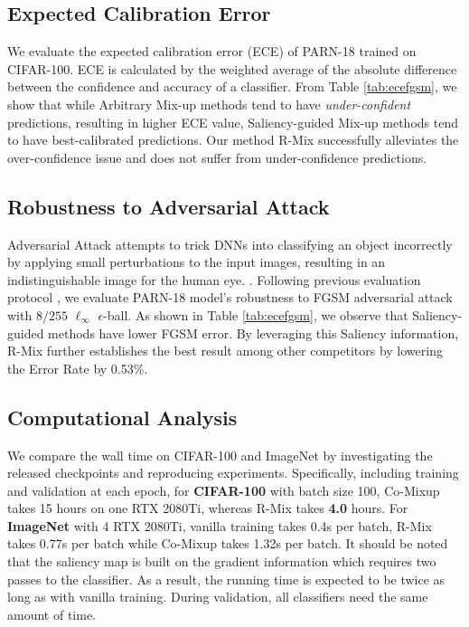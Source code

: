 \documentclass[letterpaper]{article} \usepackage[submission]{aaai23}  \usepackage{times}  \usepackage{helvet}  \usepackage{courier}  \usepackage[hyphens]{url}  \usepackage{graphicx} \urlstyle{rm} \def\UrlFont{\rm}  \usepackage{natbib}  \usepackage{caption} \frenchspacing  \setlength{\pdfpagewidth}{8.5in} \setlength{\pdfpageheight}{11in}
\newcommand{\comixup}{{Co-Mixup}}
\newcommand{\rrlmix}{{R-Mix}}
\newcommand{\cifar}{CIFAR-100}
\newcommand{\imagenet}{ImageNet}
\begin{document}
\subsection{Expected Calibration Error}
We evaluate the expected calibration error (ECE) \cite{guo2017calibration} of PARN-18 trained
on CIFAR-100. ECE is calculated by the weighted average of the absolute difference between the confidence and accuracy of a classifier. From Table \ref{tab:ecefgsm}, we show that while Arbitrary Mix-up methods tend to have \emph{under-confident} predictions, resulting in higher ECE value, Saliency-guided Mix-up methods tend to have best-calibrated predictions. Our method \rrlmix{} successfully alleviates the over-confidence issue and does not suffer from under-confidence predictions.

\subsection{Robustness to Adversarial Attack}
Adversarial Attack attempts to trick DNNs into classifying an object incorrectly by applying small perturbations to the input images, resulting in an indistinguishable image for the human eye. \cite{szegedy2013intriguing}. Following previous evaluation protocol \cite{kim2020puzzlemix}, we evaluate PARN-18 model's robustness to FGSM adversarial attack with $8/255$ $\ell_{\infty}$ $\epsilon$-ball. As shown in Table \ref{tab:ecefgsm}, we observe that Saliency-guided methods have lower FGSM error. By leveraging this Saliency information, \rrlmix{} further establishes the best result among other competitors by lowering the Error Rate by 0.53\%. 

\subsection{Computational Analysis}
We compare the wall time on \cifar{} and \imagenet{} by investigating the released checkpoints and reproducing experiments. Specifically, including training and validation at each epoch, for \textbf{\cifar{}} with batch size 100, \comixup{} takes 15 hours on one RTX 2080Ti, whereas \rrlmix{} takes \textbf{4.0} hours. For \textbf{\imagenet{}} with 4 RTX 2080Ti, vanilla training takes 0.4s per batch, \rrlmix{} takes 0.77s per batch while \comixup{} takes 1.32s per batch. It should be noted that the saliency map is built on the gradient information \cite{simonyan2014sal} which requires two passes to the classifier. As a result, the running time is expected to be twice as long as with vanilla training. During validation, all classifiers need the same amount of time.
\end{document}

